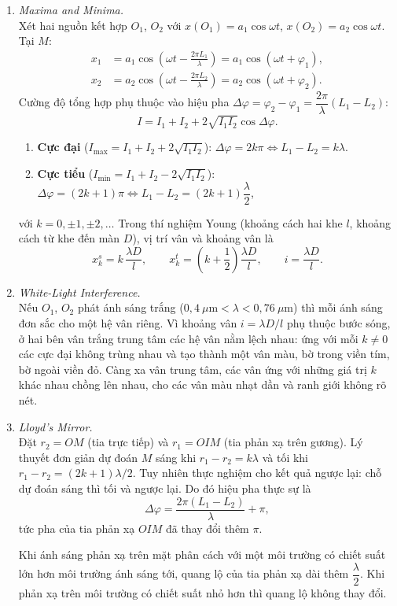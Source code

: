 \begin{enumerate}
\item \textit{Maxima and Minima.}\\
Xét hai nguồn kết hợp $O_1$, $O_2$ với $x(O_1) = a_1\cos\omega t$, $x(O_2) = a_2\cos\omega t$. Tại $M$:
\begin{align*}
x_1 &= a_1\cos\left(\omega t - \frac{2\pi L_1}{\lambda}\right) = a_1\cos(\omega t + \varphi_1),\\
x_2 &= a_2\cos\left(\omega t - \frac{2\pi L_2}{\lambda}\right) = a_2\cos(\omega t + \varphi_2).
\end{align*}
Cường độ tổng hợp phụ thuộc vào hiệu pha $\Delta\varphi = \varphi_2 - \varphi_1 = \dfrac{2\pi}{\lambda}(L_1 - L_2)$:
\[
I = I_1 + I_2 + 2\sqrt{I_1 I_2}\cos\Delta\varphi.
\]
\begin{enumerate}
  \item[(a)] \textbf{Cực đại} ($I_{\max} = I_1 + I_2 + 2\sqrt{I_1I_2}$): $\Delta\varphi = 2k\pi \Leftrightarrow L_1 - L_2 = k\lambda$.
  \item[(b)] \textbf{Cực tiểu} ($I_{\min} = I_1 + I_2 - 2\sqrt{I_1I_2}$): $\Delta\varphi = (2k+1)\pi \Leftrightarrow L_1 - L_2 = (2k+1)\dfrac{\lambda}{2}$,
\end{enumerate}
với $k = 0, \pm1, \pm2, \dots$ Trong thí nghiệm Young (khoảng cách hai khe $l$, khoảng cách từ khe đến màn $D$), vị trí vân và khoảng vân là
\[
x_k^{s} = k\,\frac{\lambda D}{l},
\qquad
x_k^{t} = \left(k + \frac12\right)\frac{\lambda D}{l},
\qquad
i = \frac{\lambda D}{l}.
\]

\item \textit{White-Light Interference.}\\
Nếu $O_1$, $O_2$ phát ánh sáng trắng ($0{,}4\ \mu\text{m} < \lambda < 0{,}76\ \mu\text{m}$) thì mỗi ánh sáng đơn sắc cho một hệ vân riêng. Vì khoảng vân $i = \lambda D/l$ phụ thuộc bước sóng, ở hai bên vân trắng trung tâm các hệ vân nằm lệch nhau: ứng với mỗi $k \neq 0$ các cực đại không trùng nhau và tạo thành một vân màu, bờ trong viền tím, bờ ngoài viền đỏ. Càng xa vân trung tâm, các vân ứng với những giá trị $k$ khác nhau chồng lên nhau, cho các vân màu nhạt dần và ranh giới không rõ nét.

\item \textit{Lloyd's Mirror.}\\
Đặt $r_2 = OM$ (tia trực tiếp) và $r_1 = OIM$ (tia phản xạ trên gương). Lý thuyết đơn giản dự đoán $M$ sáng khi $r_1 - r_2 = k\lambda$ và tối khi $r_1 - r_2 = (2k+1)\lambda/2$. Tuy nhiên thực nghiệm cho kết quả ngược lại: chỗ dự đoán sáng thì tối và ngược lại. Do đó hiệu pha thực sự là
\[
\Delta\varphi = \frac{2\pi(L_1 - L_2)}{\lambda} + \pi,
\]
tức pha của tia phản xạ $OIM$ đã thay đổi thêm $\pi$.
\begin{theorem}
Khi ánh sáng phản xạ trên mặt phân cách với một môi trường có chiết suất lớn hơn môi trường ánh sáng tới, quang lộ của tia phản xạ dài thêm $\dfrac{\lambda}{2}$. Khi phản xạ trên môi trường có chiết suất nhỏ hơn thì quang lộ không thay đổi.
\end{theorem}


\end{enumerate}
